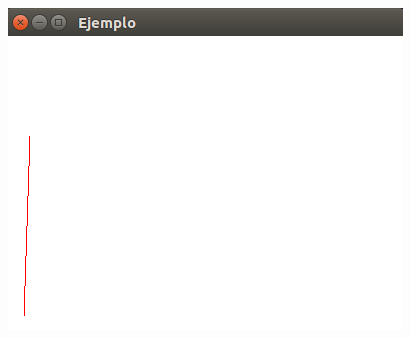 \documentclass[a4paper,12pt]{article}
\begin{document}
\begin{figure}[H]
 \centering
 \includegraphics[scale = 0.5]{4.png}
\end{figure}
\end{document}
